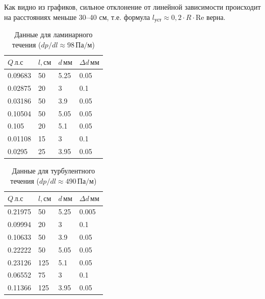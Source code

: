 Как видно из графиков, сильное отклонение от линейной зависимости происходит
на расстояниях меньше 30--40 см, т.е. формула $l_\text{уст}\approx 0{,}2\cdot R\cdot\mathrm{Re}$
верна.

\begin{table}[!ht]
    \caption{Данные для ламинарного течения ($dp/dl\approx 98\,\text{Па}/\text{м}$)}
    \begin{tabular}{|l|l|l|l|}
    \hline
        $Q\,\text{л}.\text{с}$ & $l,\text{см}$ & $d\,\text{мм}$ & $\Delta d\,\text{мм}$ \\ \hline
        0.09683 & 50 & 5.25 & 0.05 \\ \hline
        0.02875 & 20 & 3 & 0.1 \\ \hline
        0.03186 & 50 & 3.9 & 0.05 \\ \hline
        0.10504 & 50 & 5.05 & 0.05 \\ \hline
        0.105 & 20 & 5.1 & 0.05 \\ \hline
        0.01108 & 15 & 3 & 0.1 \\ \hline
        0.0295 & 25 & 3.95 & 0.05 \\ \hline
    \end{tabular}
\end{table}

\begin{table}[!ht]
    \caption{Данные для турбулентного течения ($dp/dl\approx 490\,\text{Па}/\text{м}$)}
    \begin{tabular}{|l|l|l|l|}
    \hline
        $Q\,\text{л}.\text{с}$ & $l,\text{см}$ & $d\,\text{мм}$ & $\Delta d\,\text{мм}$ \\ \hline
        0.21975 & 50 & 5.25 & 0.005 \\ \hline
        0.09994 & 20 & 3 & 0.1 \\ \hline
        0.10633 & 50 & 3.9 & 0.05 \\ \hline
        0.22222 & 50 & 5.05 & 0.05 \\ \hline
        0.23126 & 125 & 5.1 & 0.05 \\ \hline
        0.06552 & 75 & 3 & 0.1 \\ \hline
        0.11366 & 125 & 3.95 & 0.05 \\ \hline
    \end{tabular}
\end{table}

